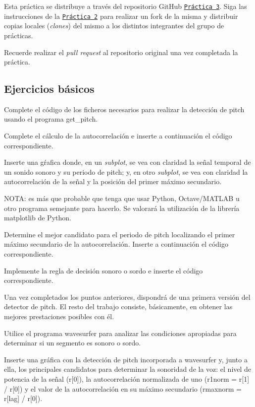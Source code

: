 Esta práctica se distribuye a través del repositorio Git\+Hub \href{https://github.com/albino-pav/P3}{\tt Práctica 3}. Siga las instrucciones de la \href{https://github.com/albino-pav/P2}{\tt Práctica 2} para realizar un {\ttfamily fork} de la misma y distribuir copias locales ({\itshape clones}) del mismo a los distintos integrantes del grupo de prácticas.

Recuerde realizar el {\itshape pull request} al repositorio original una vez completada la práctica.

\subsection*{Ejercicios básicos }


\begin{DoxyItemize}
\item Complete el código de los ficheros necesarios para realizar la detección de pitch usando el programa {\ttfamily get\+\_\+pitch}.
\begin{DoxyItemize}
\item Complete el cálculo de la autocorrelación e inserte a continuación el código correspondiente.
\item Inserte una gŕafica donde, en un {\itshape subplot}, se vea con claridad la señal temporal de un sonido sonoro y su periodo de pitch; y, en otro {\itshape subplot}, se vea con claridad la autocorrelación de la señal y la posición del primer máximo secundario.

N\+O\+TA\+: es más que probable que tenga que usar Python, Octave/\+M\+A\+T\+L\+AB u otro programa semejante para hacerlo. Se valorará la utilización de la librería matplotlib de Python.
\item Determine el mejor candidato para el periodo de pitch localizando el primer máximo secundario de la autocorrelación. Inserte a continuación el código correspondiente.
\item Implemente la regla de decisión sonoro o sordo e inserte el código correspondiente.
\end{DoxyItemize}
\item Una vez completados los puntos anteriores, dispondrá de una primera versión del detector de pitch. El resto del trabajo consiste, básicamente, en obtener las mejores prestaciones posibles con él.
\begin{DoxyItemize}
\item Utilice el programa {\ttfamily wavesurfer} para analizar las condiciones apropiadas para determinar si un segmento es sonoro o sordo.
\begin{DoxyItemize}
\item Inserte una gráfica con la detección de pitch incorporada a {\ttfamily wavesurfer} y, junto a ella, los principales candidatos para determinar la sonoridad de la voz\+: el nivel de potencia de la señal (r\mbox{[}0\mbox{]}), la autocorrelación normalizada de uno (r1norm = r\mbox{[}1\mbox{]} / r\mbox{[}0\mbox{]}) y el valor de la autocorrelación en su máximo secundario (rmaxnorm = r\mbox{[}lag\mbox{]} / r\mbox{[}0\mbox{]}).


\end{DoxyItemize}
\end{DoxyItemize}
\end{DoxyItemize}

